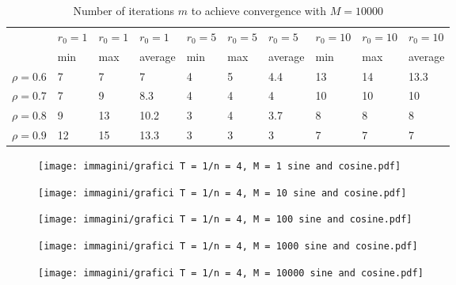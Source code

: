 \documentclass[a4paper,11pt,openright]{report}
\begin{document}
\begin{table}[H]
\centering
\addtolength{\leftskip}{-1.5cm}
\addtolength{\rightskip}{-1.5cm}
\begin{tabular}{|c|lllllllll|}
\hline
$ $ & $r_0 = 1$ & $r_0 = 1$ & $r_0 = 1$ & $r_0 = 5$ & $r_0 = 5$ & $r_0 = 5$ & $r_0 = 10$ & $r_0 = 10$ & $r_0 = 10$  \\
$ $ & min & max & average & min & max & average & min & max & average \\ 
\hline
$\rho = 0.6$ & 7 & 7 & 7 & 4 & 5 & 4.4 & 13 & 14 & 13.3 \\

$\rho = 0.7$ & 7 & 9 & 8.3 & 4 & 4 & 4 & 10 & 10 & 10\\

$\rho = 0.8$ & 9 & 13 & 10.2 & 3 & 4 & 3.7 & 8 & 8 & 8\\

$\rho = 0.9$ & 12 & 15 & 13.3 & 3 & 3 & 3 & 7 & 7 & 7\\
\hline
\end{tabular}
\caption{Number of iterations $m$ to achieve convergence with $M = 10000$}
\end{table}
\begin{figure}[H]
\centering
\texttt{[image: immagini/grafici T = 1/n = 4, M = 1 sine and cosine.pdf]}
\end{figure}
\begin{figure}[H]
\centering
\texttt{[image: immagini/grafici T = 1/n = 4, M = 10 sine and cosine.pdf]}
\end{figure}
\begin{figure}[H]
\centering
\texttt{[image: immagini/grafici T = 1/n = 4, M = 100 sine and cosine.pdf]}
\end{figure}
\begin{figure}[H]
\centering
\texttt{[image: immagini/grafici T = 1/n = 4, M = 1000 sine and cosine.pdf]}
\end{figure}
\begin{figure}[H]
\centering
\texttt{[image: immagini/grafici T = 1/n = 4, M = 10000 sine and cosine.pdf]}
\end{figure}
\newpage
\end{document}
